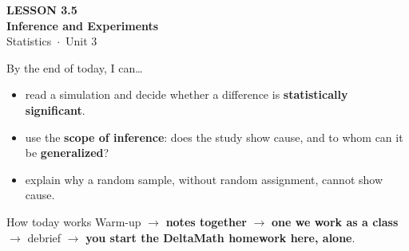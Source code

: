 \documentclass[aspectratio=169, 11pt]{beamer}
\begin{document}
{
\begin{frame}[plain]
  \vspace{2.8cm}\hspace{0.55cm}%
  \begin{minipage}{0.9\textwidth}
    {\color{goldacc}\bfseries\small LESSON 3.5}\\[0.5cm]
    {\color{white}\bfseries\LARGE Inference and Experiments}\\[1.2cm]
    {\color{skymid}\small Statistics~$\cdot$~Unit 3}
  \end{minipage}
\end{frame}
}

\newcommand{\redink}[1]{{\color{redacc}\bfseries #1}}

\begin{frame}[t, plain]
  By the end of today, I can\ldots
  \begin{itemize}\setlength{\itemsep}{5pt}
    \item read a simulation and decide whether a difference is \textbf{statistically
          significant}.
    \item use the \textbf{scope of inference}: does the study show cause, and to whom can it
          be \textbf{generalized}?
    \item explain why a random sample, without random assignment, cannot show cause.
  \end{itemize}
  \begin{block}{How today works}
    Warm-up $\to$ \textbf{notes together} $\to$ \textbf{one we work as a class} $\to$
    debrief $\to$ \textbf{you start the DeltaMath homework here, alone}.
  \end{block}
\end{frame}
\end{document}
